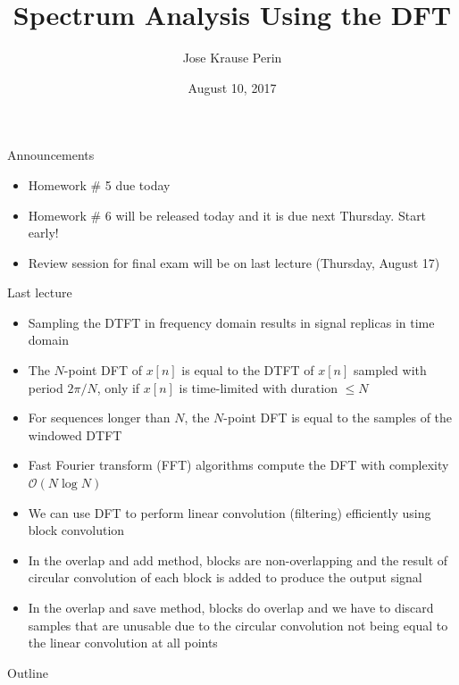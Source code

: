 \documentclass[10pt]{beamer}
\title[EE 264]{Spectrum Analysis Using the DFT}
\author{Jose Krause Perin}
\institute{Stanford University}
\date{August 10, 2017}
\begin{document}
\begin{frame}
  \titlepage
\end{frame}

%
\begin{frame}{Announcements}
\begin{itemize}
	\item Homework \# 5 due today
	\item Homework \# 6 will be released today and it is due next Thursday. Start early!
	\item Review session for final exam will be on last lecture (Thursday, August 17)
\end{itemize}
\end{frame}

%
\begin{frame}{Last lecture}
\begin{itemize}
	\item Sampling the DTFT in frequency domain results in signal replicas in time domain
	\item The $N$-point DFT of $x[n]$ is equal to the DTFT of $x[n]$ sampled with period $2\pi/N$, only if $x[n]$ is time-limited with duration $\leq N$
	\item For sequences longer than $N$, the $N$-point DFT is equal to the samples of the windowed DTFT
	\item Fast Fourier transform (FFT) algorithms compute the DFT with complexity $\mathcal{O}(N\log N)$
	\item We can use DFT to perform linear convolution (filtering) efficiently using block convolution
	\item In the overlap and add method, blocks are non-overlapping and the result of circular convolution of each block is added to produce the output signal
	\item In the overlap and save method, blocks do overlap and we have to discard samples that are unusable due to the circular convolution not being equal to the linear convolution at all points
\end{itemize}
\end{frame}

%
\begin{frame}{Outline}
	\tableofcontents
\end{frame}

%
\end{document}
